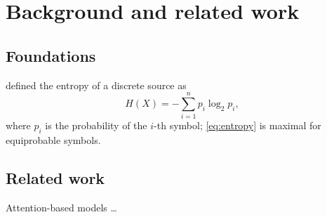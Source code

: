 \chapter{Background and related work}\label{ch:background}


\section{Foundations}\label{sec:foundations}

\Textcite{shannon1948mathematical} defined the entropy of a discrete source as
\begin{equation}
  H(X) = -\sum_{i=1}^{n} p_i \log_2 p_i ,
  \label{eq:entropy}
\end{equation}
where $p_i$ is the probability of the $i$-th symbol; \cref{eq:entropy} is
maximal for equiprobable symbols.

\section{Related work}\label{sec:related-work}

Attention-based models \autocite{vaswani2017attention} \ldots
